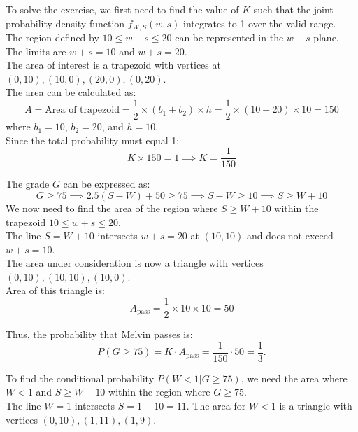 \begin{solution}
To solve the exercise, we first need to find the value of \( K \) such that the joint probability density function \( f_{W,S}(w, s) \) integrates to 1 over the valid range.\\

   The region defined by \( 10 \leq w + s \leq 20 \) can be represented in the \( w-s \) plane. The limits are \( w + s = 10 \) and \( w + s = 20 \).\\

   The area of interest is a trapezoid with vertices at \( (0, 10), (10, 0), (20, 0), (0, 20) \).\\

   The area can be calculated as:
   \[
   A = \text{Area of trapezoid} = \frac{1}{2} \times (b_1 + b_2) \times h = \frac{1}{2} \times (10 + 20) \times 10 = 150
   \]
   where \( b_1 = 10 \), \( b_2 = 20 \), and \( h = 10 \).\\

   Since the total probability must equal 1:
   \[
   K \times 150 = 1 \implies K = \frac{1}{150}
   \]

   The grade \( G \) can be expressed as:
   \[
   G \geq 75 \implies 2.5(S - W) + 50 \geq 75 \implies S - W \geq 10 \implies S \geq W + 10
   \]
   We now need to find the area of the region where \( S \geq W + 10 \) within the trapezoid \( 10 \leq w + s \leq 20 \).\\

   The line \( S = W + 10 \) intersects \( w + s = 20 \) at \( (10, 10) \) and does not exceed \( w + s = 10 \). \\

   The area under consideration is now a triangle with vertices \( (0, 10), (10, 10), (10, 0) \).\\

   Area of this triangle is:
   \[
   A_{\text{pass}} = \frac{1}{2} \times 10 \times 10 = 50
   \]

   Thus, the probability that Melvin passes is:
   \[
   P(G \geq 75) = K \cdot A_{\text{pass}} = \frac{1}{150} \cdot 50 = \frac{1}{3}.
   \]

   To find the conditional probability \( P(W < 1 | G \geq 75) \), we need the area where \( W < 1 \) and \( S \geq W + 10 \) within the region where \( G \geq 75 \).\\

   The line \( W = 1 \) intersects \( S = 1 + 10 = 11 \). The area for \( W < 1 \) is a triangle with vertices \( (0, 10), (1, 11), (1, 9) \).\\


\end{solution}
